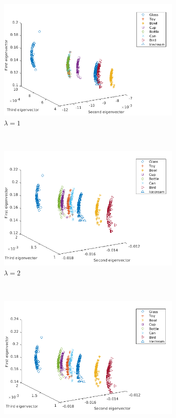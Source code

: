 \documentclass[10pt,a4paper]{article}
\theoremstyle{plain}
\theoremstyle{definition}
\begin{document}
\begin{figure}[H]
	\centering
	\begin{subfigure}[b]{0.5\textwidth}
		\includegraphics[width= \textwidth]{images/Zeta-Laplace1.png}
		\caption{$\lambda=1$}
		\label{}
	\end{subfigure}~
	\begin{subfigure}[b]{0.5\textwidth}
		\includegraphics[width= \textwidth]{images/Zeta-Laplace3.png}
		\caption{$\lambda=2$}
		\label{}
	\end{subfigure}\\
	\begin{subfigure}[b]{0.5\textwidth}
		\includegraphics[width= \textwidth]{images/Zeta-Laplace4.png}

\end{subfigure}
\end{figure}
\end{document}
